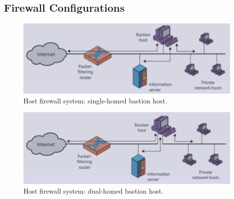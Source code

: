 \documentclass[11pt, a4paper, twoside, italian]{report}
\theoremstyle{plain}
\begin{document}
\subsection*{Firewall Configurations}
\begin{multicols}{2}
	\begin{figure}[H]
		\centering
		\includegraphics[scale=0.53]{firewall1}
		\caption*{Host firewall system: single-homed bastion host.}
	\end{figure}
\columnbreak
	\begin{figure}[H]
		\centering
		\includegraphics[scale=0.52]{firewall2}
		\caption*{Host firewall system: dual-homed bastion host.}
	\end{figure}
\end{multicols}
\end{document}
